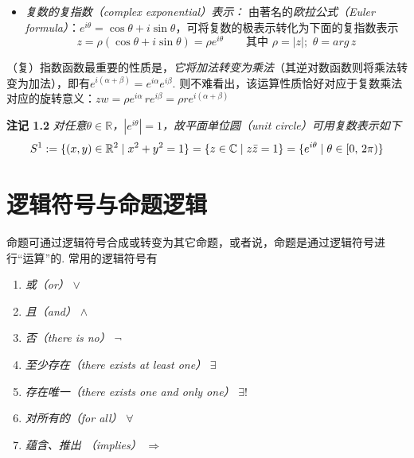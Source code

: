 \documentclass{article}
\begin{document}
\begin{itemize}
\begin{center}
    \end{center}
\end{itemize}

\begin{itemize}
    \item \textit{复数的复指数（complex exponential）表示：} 由著名的\textit{欧拉公式（Euler formula）}：$e^{i\theta}=\cos\theta+i\sin\theta$，可将复数的极表示转化为下面的复指数表示\[z=\rho(\cos\theta+i\sin\theta)=\rho e^{i\theta}\qquad \textit{其中}\,\,\rho=|z|;\,\,\theta=arg\,z\]
\end{itemize}

（复）指数函数最重要的性质是，\textit{它将加法转变为乘法}（其逆对数函数则将乘法转变为加法），即有$e^{i(\alpha+\beta)}=e^{i\alpha}e^{i\beta}$. 则不难看出，该运算性质恰好对应于复数乘法对应的旋转意义：$zw=\rho e^{i\alpha}\,re^{i\beta}=\rho r e^{i(\alpha+\beta)}$

\vspace{4pt}

\textbf{注记 1.2} \textit{对任意$\theta\in \mathbb{R}$，$|e^{i\theta}|=1$，故平面单位圆（unit circle）可用复数表示如下}\[S^{1}:=\{(x,y)\in \mathbb{R}^{2}\mid x^{2}+y^{2}=1\}=\{z\in \mathbb{C}\mid z\Bar{z}=1\}=\{e^{i\theta}\mid \theta\in [0,\,2\pi)\}\]


\section{逻辑符号与命题逻辑}

命题可通过逻辑符号合成或转变为其它命题，或者说，命题是通过逻辑符号进行“运算”的. 常用的逻辑符号有
\begin{enumerate}
    \item \textit{或（or）} $\lor$
    \item \textit{且（and）} $\land$
    \item \textit{否（there is no）} $\neg$
    \item \textit{至少存在（there exists at least one）} $\exists$
    \item \textit{存在唯一（there exists one and only one）} $\exists!$
    \item \textit{对所有的（for all）} $\forall$
     \item \textit{蕴含、推出 （implies）} $\Rightarrow$ 
\end{enumerate}
\end{document}
